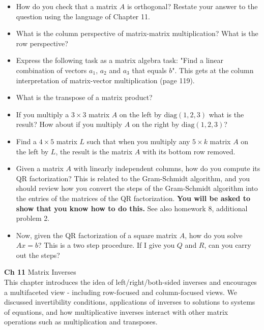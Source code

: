 \documentclass[11pt,fleqn]{article}
\begin{document}
	\begin{itemize}
	\item How do you check that a matrix $A$ is orthogonal? Restate your answer to the question using the language of Chapter 11.
	\item What is the column perspective of matrix-matrix multiplication?  What is the row perspective?
	\item Express the following task as a matrix algebra task: "Find a linear combination of vectors $a_1$, $a_2$ and $a_3$
that equals $b$".  This gets at the column interpretation of matrix-vector multiplication (page 119).
	\item What is the transpose of a matrix product?
	\item If you multiply a $3\times 3$ matrix $A$ on the left by $\mathrm{diag}(1,2,3)$ what
is the result?  How about if you multiply $A$ on the right 
by $\mathrm{diag}(1,2,3)$?
	\item Find a $4\times 5$ matrix $L$ such that when you multiply any $5\times k$ matrix
$A$ on the left by $L$, the result is the matrix $A$ with its bottom row removed.
	\item Given a matrix $A$ with linearly independent columns,
how do you compute its QR factorization?  This is related to the Gram-Schmidt algorithm,
and you should review how you convert the steps of the Gram-Schmidt algorithm into
the entries of the matrices of the QR factorization. \textbf{You will be asked to show 
that you know how to do this.}  See also homework 8,
additional problem 2.
	\item Now, given the QR factorization of a square matrix $A$, how do you solve $Ax=b$?
This is a two step procedure.  If I give you $Q$ and $R$, can you carry out the steps?
	\end{itemize}

\noindent\textbf{Ch 11} Matrix Inverses\\

This chapter introduces the idea of left/right/both-sided inverses and encourages a multifaceted view - including row-focused and column-focused views. We discussed invertibility conditions, applications of inverses to solutions to systems of equations, and how multiplicative inverses interact with other matrix operations such as multiplication and transposes.
\end{document}

